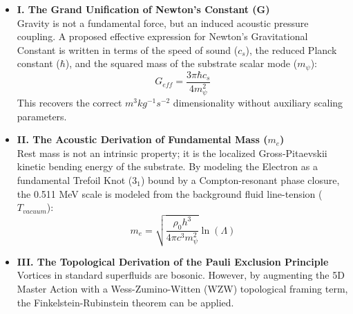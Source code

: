 \documentclass[11pt,a4paper]{article}
\begin{document}
\begin{itemize}
    \item \textbf{I. The Grand Unification of Newton’s Constant (G)}\\
    Gravity is not a fundamental force, but an induced acoustic pressure coupling. A proposed
    effective expression for Newton’s Gravitational Constant is written in terms of the speed of sound
    ($c_s$), the reduced Planck constant ($\hbar$), and the squared mass of the substrate scalar mode ($m_\psi$):
    \begin{equation}
        G_{eff} = \frac{3\pi\hbar c_s}{4m_\psi^2}
    \end{equation}
    This recovers the correct $m^3 kg^{-1} s^{-2}$ dimensionality without auxiliary scaling parameters.

    \item \textbf{II. The Acoustic Derivation of Fundamental Mass ($m_e$)}\\
    Rest mass is not an intrinsic property; it is the localized Gross-Pitaevskii kinetic bending energy
    of the substrate. By modeling the Electron as a fundamental Trefoil Knot ($3_1$) bound by a
    Compton-resonant phase closure, the 0.511 MeV scale is modeled from the background fluid
    line-tension ($T_{vacuum}$):
    \begin{equation}
        m_e = \sqrt{\frac{\rho_0 h^3}{4\pi c^3 m_\psi^2}} \ln(\Lambda)
    \end{equation}

    \item \textbf{III. The Topological Derivation of the Pauli Exclusion Principle}\\
    Vortices in standard superfluids are bosonic. However, by augmenting the 5D Master Action with
    a Wess-Zumino-Witten (WZW) topological framing term, the Finkelstein-Rubinstein theorem
    can be applied.
\end{itemize}
\end{document}
